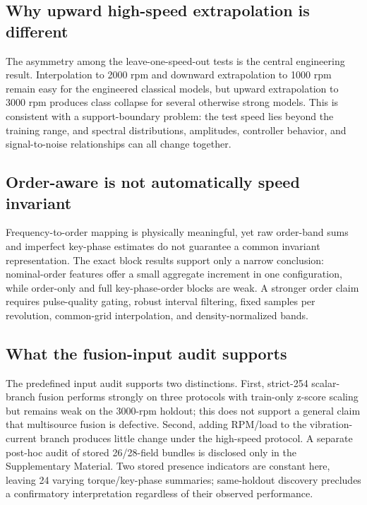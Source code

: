 \documentclass[11pt]{article}
\begin{document}
\subsection{Why upward high-speed extrapolation is different}
The asymmetry among the leave-one-speed-out tests is the central engineering result. Interpolation to 2000 rpm and downward extrapolation to 1000 rpm remain easy for the engineered classical models, but upward extrapolation to 3000 rpm produces class collapse for several otherwise strong models. This is consistent with a support-boundary problem: the test speed lies beyond the training range, and spectral distributions, amplitudes, controller behavior, and signal-to-noise relationships can all change together.

\subsection{Order-aware is not automatically speed invariant}
Frequency-to-order mapping is physically meaningful, yet raw order-band sums and imperfect key-phase estimates do not guarantee a common invariant representation. The exact block results support only a narrow conclusion: nominal-order features offer a small aggregate increment in one configuration, while order-only and full key-phase-order blocks are weak. A stronger order claim requires pulse-quality gating, robust interval filtering, fixed samples per revolution, common-grid interpolation, and density-normalized bands.

\subsection{What the fusion-input audit supports}
The predefined input audit supports two distinctions. First, strict-254 scalar-branch fusion performs strongly on three protocols with train-only z-score scaling but remains weak on the 3000-rpm holdout; this does not support a general claim that multisource fusion is defective. Second, adding RPM/load to the vibration-current branch produces little change under the high-speed protocol. A separate post-hoc audit of stored 26/28-field bundles is disclosed only in the Supplementary Material. Two stored presence indicators are constant here, leaving 24 varying torque/key-phase summaries; same-holdout discovery precludes a confirmatory interpretation regardless of their observed performance.
\end{document}
